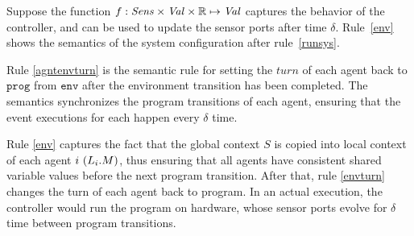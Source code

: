 Suppose the function $f:\mathit{Sens} \times \mathit{Val} \times \mathbb{R} \mapsto \mathit{Val}$ captures the behavior of the controller, and can be used to update the sensor ports after time $\delta$.
Rule~\ref{env} shows the semantics of the system configuration after rule~\ref{runsys}.

Rule \ref{agntenvturn} is the semantic rule for setting the $\mathit{turn}$ of each agent back to $\mathtt{prog}$ from $\mathtt{env}$ after the environment transition has been completed. The semantics synchronizes the program transitions of each agent, ensuring that the event executions for each happen every $\delta$ time.


Rule \ref{env} captures the fact that the global context $S$ is copied into local context of each agent $i \ (L_{i}.M)$, thus ensuring that all agents have consistent shared variable values before the next program transition. After that, rule \ref{envturn} changes the turn of each agent back to program. In an actual execution, the controller  would run the program on hardware, whose sensor ports evolve for $\delta$ time between program transitions.





